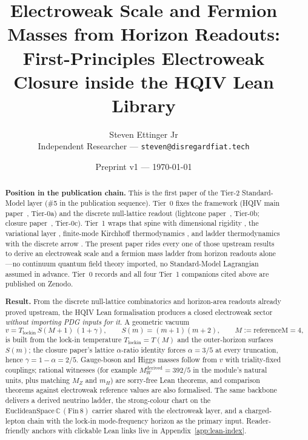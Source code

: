 \documentclass[11pt]{article}
\title{Electroweak Scale and Fermion Masses from Horizon Readouts:\\[0.35em]
First-Principles Electroweak Closure inside the HQIV Lean Library}
\author{Steven Ettinger Jr\\
{\small Independent Researcher --- \texttt{steven@disregardfiat.tech}}}
\date{Preprint v1 --- \today}
\begin{document}
\maketitle

\begin{abstract}
\noindent\textbf{Position in the publication chain.}
This is the first paper of the Tier-2 Standard-Model layer (\#5 in the
publication sequence). Tier~0 fixes the framework (HQIV main
paper~\cite{ettinger2026hqiv}, Tier-0a) and the discrete null-lattice readout
(lightcone paper~\cite{hqiv-lightcone-paper}, Tier-0b; closure
paper~\cite{hqiv-so8-paper}, Tier-0c). Tier~1 wraps that spine with
dimensional rigidity \cite{hqiv-3d-growth-paper}, the variational layer
\cite{hqiv-oct-action-paper}, finite-mode Kirchhoff thermodynamics
\cite{hqiv-kirchhoff-paper}, and ladder thermodynamics with the discrete
arrow \cite{hqiv-thermo-arrow-paper}. The present paper rides every one of
those upstream results to derive an electroweak scale and a fermion mass
ladder from horizon readouts alone---no continuum quantum field theory
imported, no Standard-Model Lagrangian assumed in advance. Tier~0 records and
all four Tier~1 companions cited above are published on Zenodo.

\noindent\textbf{Result.}
From the discrete null-lattice combinatorics and horizon-area
readouts already proved upstream, the HQIV Lean formalisation
produces a closed electroweak sector \emph{without importing PDG
inputs for it}. A geometric vacuum
\[
  v=T_{\mathrm{lockin}}\,S(M{+}1)\,(1+\gamma),
  \qquad
  S(m)=(m+1)(m+2),
  \qquad
  M:=\mathrm{referenceM}=4,
\]
is built from the lock-in temperature
$T_{\mathrm{lockin}}=T(M)$ and the outer-horizon surfaces
$S(m)$; the closure paper's lattice $\alpha$-ratio identity
forces $\alpha=3/5$ at every truncation, hence
$\gamma=1-\alpha=2/5$. Gauge-boson and Higgs masses follow from
$v$ with triality-fixed couplings; rational witnesses (for
example $M_W^{\mathrm{derived}}=392/5$ in the module's natural
units, plus matching $M_Z$ and $m_H$) are sorry-free Lean
theorems, and comparison theorems against electroweak reference
values \cite{pdg2024} are also formalised. The same backbone
delivers a derived neutrino ladder, the strong-colour chart on
the $\mathrm{EuclideanSpace}\,\mathbb{C}\,(\mathrm{Fin}\,8)$
carrier shared with the electroweak layer, and a charged-lepton
chain with the lock-in mode-frequency horizon as the primary
input. Reader-friendly anchors with clickable Lean links live in
Appendix~\ref{app:lean-index}.


\end{abstract}
\end{document}
